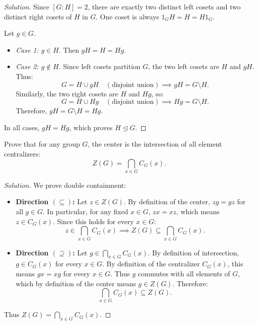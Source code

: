 \begin{proof}[Solution]
Since $[G : H] = 2$, there are exactly two distinct left cosets and two distinct right cosets of $H$ in $G$.
One coset is always $1_G H = H = H 1_G$.

Let $g \in G$.
\begin{itemize}[leftmargin=1.5em, itemsep=4pt]
    \item \emph{Case 1: $g \in H$.}
    Then $gH = H = Hg$.
    
    \item \emph{Case 2: $g \notin H$.}
    Since left cosets partition $G$, the two left cosets are $H$ and $gH$. Thus:
    \begin{equation*}
    G = H \cup gH \quad (\text{disjoint union}) \implies gH = G \setminus H.
    \end{equation*}
    Similarly, the two right cosets are $H$ and $Hg$, so:
    \begin{equation*}
    G = H \cup Hg \quad (\text{disjoint union}) \implies Hg = G \setminus H.
    \end{equation*}
    Therefore, $gH = G \setminus H = Hg$.
\end{itemize}
In all cases, $gH = Hg$, which proves $H \trianglelefteq G$.
\end{proof}

\begin{problem}
Prove that for any group $G$, the center is the intersection of all element centralizers:
\begin{equation}
Z(G) = \bigcap_{x \in G} C_G(x).
\end{equation}
\end{problem}

\begin{proof}[Solution]
We prove double containment:
\begin{itemize}[leftmargin=1.5em, itemsep=6pt]
    \item \textbf{Direction $(\subseteq)$:}
    Let $z \in Z(G)$.
    By definition of the center, $zg = gz$ for all $g \in G$.
    In particular, for any fixed $x \in G$, $zx = xz$, which means $z \in C_G(x)$.
    Since this holds for every $x \in G$:
    \begin{equation*}
    z \in \bigcap_{x \in G} C_G(x) \implies Z(G) \subseteq \bigcap_{x \in G} C_G(x).
    \end{equation*}

    \item \textbf{Direction $(\supseteq)$:}
    Let $g \in \bigcap_{x \in G} C_G(x)$.
    By definition of intersection, $g \in C_G(x)$ for every $x \in G$.
    By definition of the centralizer $C_G(x)$, this means $gx = xg$ for every $x \in G$.
    Thus $g$ commutes with all elements of $G$, which by definition of the center means $g \in Z(G)$.
    Therefore:
    \begin{equation*}
    \bigcap_{x \in G} C_G(x) \subseteq Z(G).
    \end{equation*}
\end{itemize}
Thus $Z(G) = \bigcap_{x \in G} C_G(x)$.
\end{proof}

